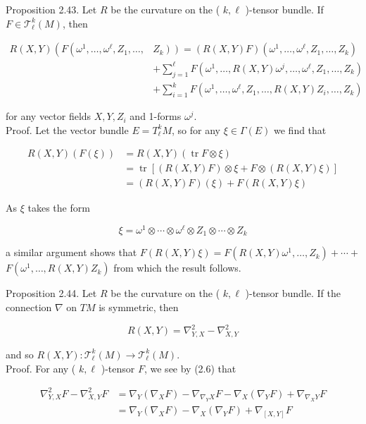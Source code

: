 \documentclass[10pt, letterpaper]{article}
\begin{document}
Proposition 2.43. Let $R$ be the curvature on the ( $k, \ell$ )-tensor bundle. If $F \in \mathscr{T}_{\ell}^{k}(M)$, then

$$
\begin{aligned}
R(X, Y)\left(F \left(\omega^{1}, \ldots, \omega^{\ell}, Z_{1}, \ldots,\right.\right. & \left.\left.Z_{k}\right)\right)=(R(X, Y) F)\left(\omega^{1}, \ldots, \omega^{\ell}, Z_{1}, \ldots, Z_{k}\right) \\
& +\sum_{j=1}^{\ell} F\left(\omega^{1}, \ldots, R(X, Y) \omega^{j}, \ldots, \omega^{\ell}, Z_{1}, \ldots, Z_{k}\right) \\
& +\sum_{i=1}^{k} F\left(\omega^{1}, \ldots, \omega^{\ell}, Z_{1}, \ldots, R(X, Y) Z_{i}, \ldots, Z_{k}\right)
\end{aligned}
$$

for any vector fields $X, Y, Z_{i}$ and 1-forms $\omega^{j}$.\\
Proof. Let the vector bundle $E=T_{\ell}^{k} M$, so for any $\xi \in \Gamma(E)$ we find that

$$
\begin{aligned}
R(X, Y)(F(\xi)) & =R(X, Y)(\operatorname{tr} F \otimes \xi) \\
& =\operatorname{tr}[(R(X, Y) F) \otimes \xi+F \otimes(R(X, Y) \xi)] \\
& =(R(X, Y) F)(\xi)+F(R(X, Y) \xi)
\end{aligned}
$$

As $\xi$ takes the form

$$
\xi=\omega^{1} \otimes \cdots \otimes \omega^{\ell} \otimes Z_{1} \otimes \cdots \otimes Z_{k}
$$

a similar argument shows that $F(R(X, Y) \xi)=F\left(R(X, Y) \omega^{1}, \ldots, Z_{k}\right)+\cdots+$ $F\left(\omega^{1}, \ldots, R(X, Y) Z_{k}\right)$ from which the result follows.

Proposition 2.44. Let $R$ be the curvature on the ( $k, \ell$ )-tensor bundle. If the connection $\nabla$ on $T M$ is symmetric, then

$$
R(X, Y)=\nabla_{Y, X}^{2}-\nabla_{X, Y}^{2}
$$

and so $R(X, Y): \mathscr{T}_{\ell}^{k}(M) \rightarrow \mathscr{T}_{\ell}^{k}(M)$.\\
Proof. For any ( $k, \ell$ )-tensor $F$, we see by (2.6) that

$$
\begin{aligned}
\nabla_{Y, X}^{2} F-\nabla_{X, Y}^{2} F & =\nabla_{Y}\left(\nabla_{X} F\right)-\nabla_{\nabla_{Y} X} F-\nabla_{X}\left(\nabla_{Y} F\right)+\nabla_{\nabla_{X} Y} F \\
& =\nabla_{Y}\left(\nabla_{X} F\right)-\nabla_{X}\left(\nabla_{Y} F\right)+\nabla_{[X, Y]} F
\end{aligned}
$$
\end{document}
